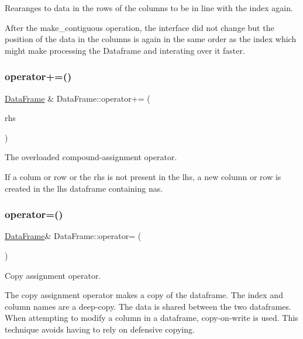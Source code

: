 Rearanges to data in the rows of the columns to be in line with the index again. 

After the make\+\_\+contiguous operation, the interface did not change but the position of the data in the columns is again in the same order as the index which might make processing the Dataframe and interating over it faster. \mbox{\label{classDataFrame_a61f3301cc72548b4b3536c0844fb156d}} 
\subsubsection{\texorpdfstring{operator+=()}{operator+=()}}
{\footnotesize\ttfamily \hyperlink{classDataFrame}{Data\+Frame} \& Data\+Frame\+::operator+= (\begin{DoxyParamCaption}\item[{const \hyperlink{classDataFrame}{Data\+Frame} \&}]{rhs }\end{DoxyParamCaption})}



The overloaded compound-\/assignment operator. 

If a colum or row or the rhs is not present in the lhs, a new column or row is created in the lhs dataframe containing nas. \mbox{\label{classDataFrame_a26164d4d8119ea34da73eb0c48bd3972}} 
\subsubsection{\texorpdfstring{operator=()}{operator=()}}
{\footnotesize\ttfamily \hyperlink{classDataFrame}{Data\+Frame}\& Data\+Frame\+::operator= (\begin{DoxyParamCaption}\item[{const \hyperlink{classDataFrame}{Data\+Frame} \&}]{ }\end{DoxyParamCaption})\hspace{0.3cm}{\ttfamily [default]}}



Copy assignment operator. 

The copy assignment operator makes a copy of the dataframe. The index and column names are a deep-\/copy. The data is shared between the two dataframes. When attempting to modify a column in a dataframe, copy-\/on-\/write is used. This technique avoids having to rely on defensive copying. 

